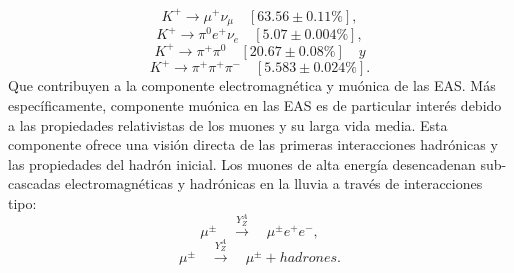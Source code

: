 \begin{equation*}
K^{+} \rightarrow \mu^{+}\nu_{\mu} \quad [{63.56 \pm 0.11}{\%}],
\end{equation*}
%
\begin{equation}
K^{+} \rightarrow \pi^{0}e^{+}\nu_{e} \quad [{5.07 \pm 0.004}{\%}],
\end{equation}
%
\begin{equation*}
K^{+} \rightarrow \pi^{+}\pi^{0} \quad [{20.67 \pm 0.08}{\%}] \quad y
\end{equation*}
%
\begin{equation*}
K^{+} \rightarrow \pi^{+}\pi^{+}\pi^{-} \quad [{5.583 \pm 0.024}{\%}] .
\end{equation*}
Que contribuyen a la componente electromagnética y muónica de las EAS. Más específicamente, componente muónica en las EAS es de particular interés debido a las propiedades relativistas de los muones y su larga vida media. Esta componente ofrece una visión directa de las primeras interacciones hadrónicas y las propiedades del hadrón inicial. Los muones de alta energía desencadenan sub-cascadas electromagnéticas y hadrónicas en la lluvia a través de interacciones tipo:
\begin{equation}
\mu^{\pm} \quad \xrightarrow{Y^{A}_{Z}} \quad \mu^{\pm}e^{+}e^{-},
\end{equation}
\begin{equation}
\mu^{\pm} \quad \xrightarrow{Y^{A}_{Z}} \quad \mu^{\pm} + hadrones.
\end{equation}